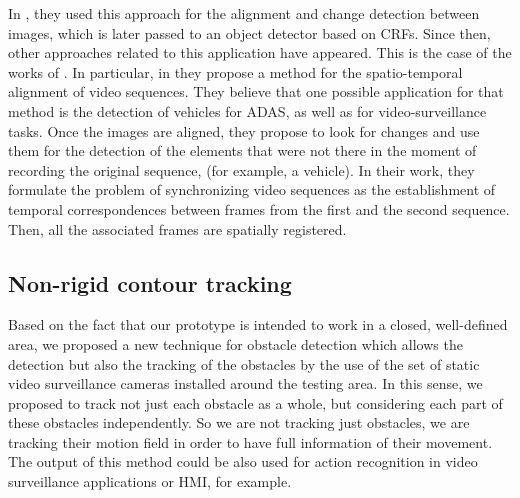 In \cite{vallespi2012prior}, they used this approach for the alignment and change detection between images, which is later passed to an object detector based on \acp{CRF}. Since then, other approaches related to this application have appeared. This is the case of the works of \cite{diego2011video, evangelidis2011slice, evangelidis2011efficient}. In particular, in \cite{diego2011video} they propose a method for the spatio-temporal alignment of video sequences. They believe that one possible application for that method is the detection of vehicles for \ac{ADAS}, as well as for video-surveillance tasks. Once the images are aligned, they propose to look for changes and use them for the detection of the elements that were not there in the moment of recording the original sequence, (for example, a vehicle). In their work, they formulate the problem of synchronizing video sequences as the establishment of temporal correspondences between frames from the first and the second sequence. Then, all the associated frames are spatially registered.

\subsection{Non-rigid contour tracking}\label{ch:chapter00_02_02}

Based on the fact that our prototype is intended to work in a closed, well-defined area, we proposed a new technique for obstacle detection which allows the detection but also the tracking of the obstacles by the use of the set of static video surveillance cameras installed around the testing area. In this sense, we proposed to track not just each obstacle as a whole, but considering each part of these obstacles independently. So we are not tracking just obstacles, we are tracking their motion field in order to have full information of their movement. The output of this method could be also used for action recognition in video surveillance applications or \ac{HMI}, for example.

